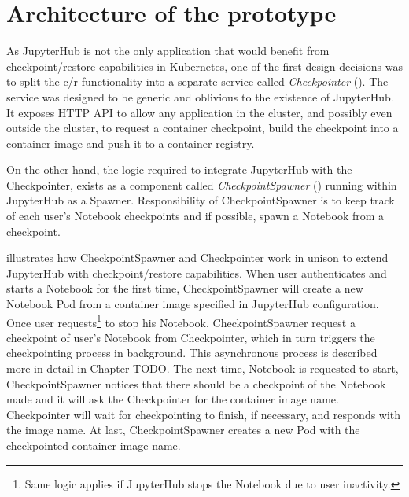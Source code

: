 \documentclass[
  digital,     %
  oneside,     %
  nosansbold,  %
  nocolorbold, %
  lof,         %
  lot,         %
]{fithesis4}
\begin{document}

\section{Architecture of the prototype}
As JupyterHub is not the only application that would benefit from checkpoint/restore capabilities in Kubernetes, one of the first design decisions was to split the c/r functionality into a separate service called \emph{Checkpointer} (). The service was designed to be generic and oblivious to the existence of JupyterHub. It exposes HTTP API to allow any application in the cluster, and possibly even outside the cluster, to request a container checkpoint, build the checkpoint into a container image and push it to a container registry.

On the other hand, the logic required to integrate JupyterHub with the Checkpointer, exists as a component called \emph{CheckpointSpawner} () running within JupyterHub as a Spawner. Responsibility of CheckpointSpawner is to keep track of each user's Notebook checkpoints and if possible, spawn a Notebook from a checkpoint. 

 illustrates how CheckpointSpawner and Checkpointer work in unison to extend JupyterHub with checkpoint/restore capabilities. When user authenticates and starts a Notebook for the first time, CheckpointSpawner will create a new Notebook Pod from a container image specified in JupyterHub configuration. Once user requests\footnote{Same logic applies if JupyterHub stops the Notebook due to user inactivity.} to stop his Notebook, CheckpointSpawner request a checkpoint of user's Notebook from Checkpointer, which in turn triggers the checkpointing process in background. This asynchronous process is described more in detail in Chapter TODO. The next time, Notebook is requested to start, CheckpointSpawner notices that there should be a checkpoint of the Notebook made and it will ask the Checkpointer for the container image name. Checkpointer will wait for checkpointing to finish, if necessary, and responds with the image name. At last, CheckpointSpawner creates a new Pod with the checkpointed container image name.
\end{document}
